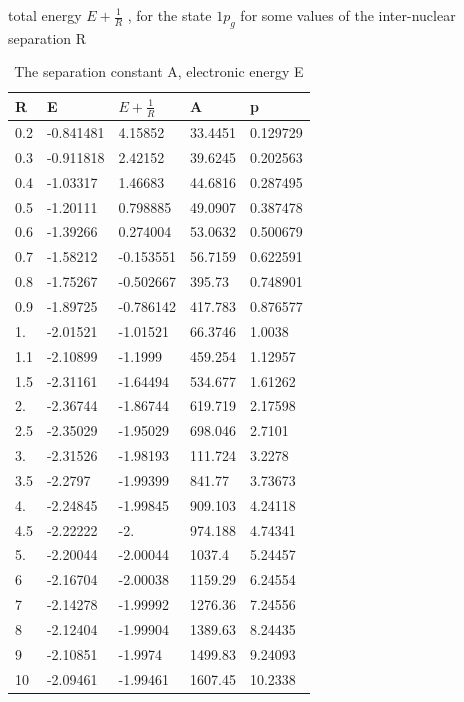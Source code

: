 \begin{table}[h!]
  \caption{ The separation constant A, electronic energy E}{ total energy $ E + \frac{1}{R} $ , for the state $ 1p_g $ for some values of the inter-nuclear separation R } 
  \centering
  \label{2sg}
		\begin{tabular}{ m{6em} m{6em}  m{6em}  m{6em} m{6em} }
			\hline
			R & E & $ E + \frac{1}{R} $ & A & p  \\ \hline \hline
  0.2 & -0.841481 & 4.15852 & 33.4451 & 0.129729\\
  0.3 & -0.911818 & 2.42152 & 39.6245 & 0.202563\\
  0.4 & -1.03317 & 1.46683 & 44.6816 & 0.287495\\
  0.5 & -1.20111 & 0.798885 & 49.0907 & 0.387478\\
  0.6 & -1.39266 & 0.274004 & 53.0632 & 0.500679\\
  0.7 & -1.58212 & -0.153551 & 56.7159 & 0.622591\\
  0.8 & -1.75267 & -0.502667 & 395.73 & 0.748901\\
  0.9 & -1.89725 & -0.786142 & 417.783 & 0.876577\\
  1. & -2.01521 & -1.01521 & 66.3746 & 1.0038\\
  1.1 & -2.10899 & -1.1999 & 459.254 & 1.12957\\
  1.5 & -2.31161 & -1.64494 & 534.677 & 1.61262\\
  2. & -2.36744 & -1.86744 & 619.719 & 2.17598\\
  2.5 & -2.35029 & -1.95029 & 698.046 & 2.7101\\
  3. & -2.31526 & -1.98193 & 111.724 & 3.2278\\
  3.5 & -2.2797 & -1.99399 & 841.77 & 3.73673\\
  4. & -2.24845 & -1.99845 & 909.103 & 4.24118\\
  4.5 & -2.22222 & -2. & 974.188 & 4.74341\\
  5. & -2.20044 & -2.00044 & 1037.4 & 5.24457\\
  6 & -2.16704 & -2.00038 & 1159.29 & 6.24554\\
  7 & -2.14278 & -1.99992 & 1276.36 & 7.24556\\
  8 & -2.12404 & -1.99904 & 1389.63 & 8.24435\\
  9 & -2.10851 & -1.9974 & 1499.83 & 9.24093\\
  10 & -2.09461 & -1.99461 & 1607.45 & 10.2338\\
		\hline
		\end{tabular}
\end{table}

